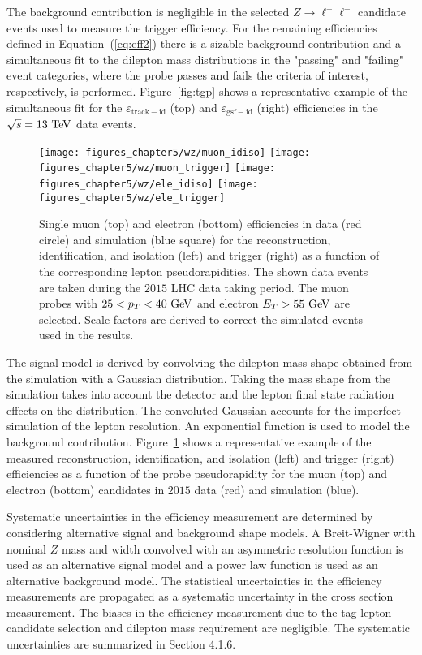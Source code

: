 The background contribution is negligible in the selected $Z \rightarrow \ell^{+}\ell^{-}$ candidate events used to measure the trigger efficiency. For the remaining efficiencies defined in Equation~(\ref{eq:eff2}) there is a sizable background contribution and a simultaneous fit to the dilepton mass distributions in the "passing" and "failing" event categories, where the probe passes and fails the criteria of interest, respectively, is performed. Figure~\ref{fig:tgp} shows a representative example of the simultaneous fit for the $\varepsilon_{\mathrm{track-id}}$ (top) and $\varepsilon_{\mathrm{gsf-id}}$ (right) efficiencies in the $\sqrt{s}=13~\mathrm{Te\kern -0.1em V}$ data events.     
\begin{figure}[htbp]
\centering
\texttt{[image: figures\_chapter5/wz/muon\_idiso]}
\texttt{[image: figures\_chapter5/wz/muon\_trigger]}
\texttt{[image: figures\_chapter5/wz/ele\_idiso]}
\texttt{[image: figures\_chapter5/wz/ele\_trigger]}
\caption{Single muon (top) and electron (bottom) efficiencies in data (red circle) and simulation (blue square) for the reconstruction, identification, and isolation (left) and trigger (right) as a function of the corresponding lepton pseudorapidities. The shown data events are taken during the $2015$ LHC data taking period. The muon probes with $25<p_{T}<40~\mathrm{Ge\kern -0.1em V}$ and electron $E_{T}>55~\mathrm{Ge\kern -0.1em V}$ are selected. Scale factors are derived to correct the simulated events used in the results.}
\label{fig:eff_fit}
\end{figure}
The signal model is derived by convolving the dilepton mass shape obtained from the simulation with a Gaussian distribution. Taking the mass shape from the simulation takes into account the detector and the lepton final state radiation effects on the distribution. The convoluted Gaussian accounts for the imperfect simulation of the lepton resolution. An exponential function is used to model the background contribution. Figure~\ref{fig:eff_fit} shows a representative example of the measured reconstruction, identification, and isolation (left) and trigger (right) efficiencies as a function of the probe pseudorapidity for the muon (top) and electron (bottom) candidates in $2015$ data (red) and simulation (blue).

Systematic uncertainties in the efficiency measurement are determined by considering alternative signal and background shape models. A Breit-Wigner with nominal $Z$ mass and width convolved with an asymmetric resolution function is used as an alternative signal model and a power law function is used as an alternative background model. The statistical uncertainties in the efficiency measurements are propagated as a systematic uncertainty in the cross section measurement. The biases in the efficiency measurement due to the tag lepton candidate selection and dilepton mass requirement are negligible. The systematic uncertainties are summarized in Section 4.1.6.    

